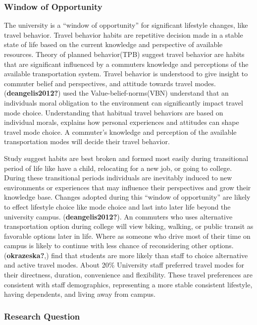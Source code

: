 \documentclass[
  letterpaper,
  DIV=11,
  numbers=noendperiod]{scrartcl}
\begin{document}
\subsubsection{Window of Opportunity}\label{window-of-opportunity}

The university is a ``window of opportunity'' for significant lifestyle
changes, like travel behavior. Travel behavior habits are repetitive
decision made in a stable state of life based on the current knowledge
and perspective of available resources. Theory of planned behavior(TPB)
suggest travel behavior are habits that are significant influenced by a
commuters knowledge and perceptions of the available transportation
system. Travel behavior is understood to give insight to commuter belief
and perspectives, and attitude towards travel modes.
(\textbf{deangelis2012?}) used the Value-belief-norms(VBN) understand
that an individuals moral obligation to the environment can
significantly impact travel mode choice. Understanding that habitual
travel behaviors are based on individual morals, explains how personal
experiences and attitudes can shape travel mode choice. A commuter's
knowledge and perception of the available transportation modes will
decide their travel behavior.

Study suggest habits are best broken and formed most easily during
transitional period of life like have a child, relocating for a new job,
or going to college. During these transitional periods individuals are
inevitably induced to new environments or experiences that may influence
their perspectives and grow their knowledge base. Changes adopted during
this ``window of opportunity'' are likely to effect lifestyle choice
like mode choice and last into later life beyond the university campus.
(\textbf{deangelis2012?}). An commuters who uses alternative
transportation option during college will view biking, walking, or
public transit as favorable options later in life. Where as someone who
drive most of their time on campus is likely to continue with less
chance of reconsidering other options. (\textbf{okrazeska?},) find that
students are more likely than staff to choice alternative and active
travel modes. About 20\% University staff preferred travel modes for
their directness, duration, convenience and flexibility. These travel
preferences are consistent with staff demographics, representing a more
stable consistent lifestyle, having dependents, and living away from
campus.

\subsubsection{Research Question}\label{research-question}
\end{document}
